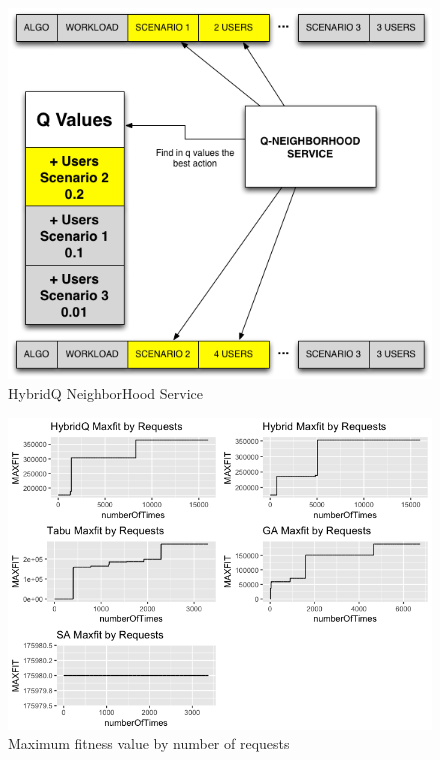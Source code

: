 \documentclass{bmcart}
\begin{document}
\begin{backmatter}
\begin{figure}[h!]
\begin{minipage}{.5\textwidth}
\includegraphics{./images/q-neighborservice.png}
\caption{HybridQ NeighborHood Service}
\label{fig:neighservice}
\end{minipage}
\end{figure}

\begin{figure}[h]
\centering
\includegraphics{./images/experiment1.png}
\caption{Maximum fitness value by number of requests}
\label{fig:experiment1}
\end{figure}




\end{backmatter}
\end{document}
